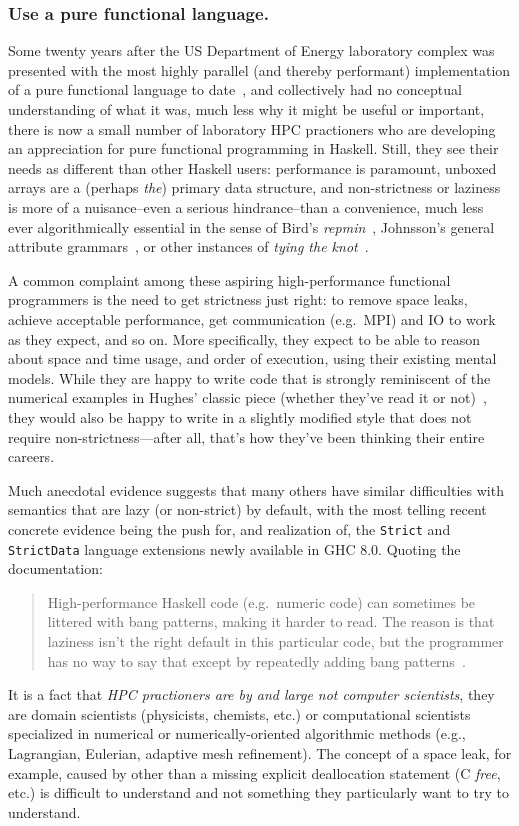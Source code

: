 \documentclass{llncs}
\begin{document}
\subsubsection{Use a pure functional language.}
Some twenty years after the US Department of Energy laboratory complex was
presented with the most highly parallel (and thereby performant)
implementation of a pure functional language to date~\cite{Davis96}, and
collectively had no conceptual understanding of what it was, much less why it
might be useful or important, there is now a small number of laboratory HPC
practioners who are developing an appreciation for pure functional programming
in Haskell.  Still, they see their needs as different than other Haskell
users: performance is paramount, unboxed arrays are a (perhaps \emph{the})
primary data structure, and non-strictness or laziness is more of a
nuisance--even a serious hindrance--than a convenience, much less ever
algorithmically essential in the sense of Bird's \emph{repmin}~\cite{Bird84},
Johnsson's general attribute grammars~\cite{Johnsson87}, or other instances
of \emph{tying the knot}~\cite{tying-the-knot}.

A common complaint among these aspiring high-performance functional
programmers is the need to get strictness just right: to remove space leaks,
achieve acceptable performance, get communication (e.g.\ MPI) and IO to work
as they expect, and so on.  More specifically, they expect to be able to
reason about space and time usage, and order of execution, using their
existing mental models. While they are happy to write code that is strongly
reminiscent of the numerical examples in Hughes' classic piece (whether
they've read it or not)~\cite{Hughes89}, they would also be happy to write in
a slightly modified style that does not require non-strictness---after all,
that's how they've been thinking their entire careers.

Much anecdotal evidence suggests that many others have similar difficulties
with semantics that are lazy (or non-strict) by default, with the most telling
recent concrete evidence being the push for, and realization of, the
\texttt{Strict} and \texttt{StrictData} language extensions newly available in
GHC 8.0.  Quoting the documentation:
\begin{quote}
  High-performance Haskell code (e.g.\ numeric code) can sometimes be littered
  with bang patterns, making it harder to read. The reason is that laziness
  isn't the right default in this particular code, but the programmer has no
  way to say that except by repeatedly adding bang
  patterns~\cite{strict-strictdata}.
\end{quote}
It is a fact that \emph{HPC practioners are by and large not computer
  scientists}, they are domain scientists (physicists, chemists, etc.) or
computational scientists specialized in numerical or numerically-oriented
algorithmic methods (e.g., Lagrangian, Eulerian, adaptive mesh refinement).
The concept of a space leak, for example, caused by other than a missing
explicit deallocation statement (C \emph{free}, etc.) is difficult to
understand and not something they particularly want to try to understand.
\end{document}
